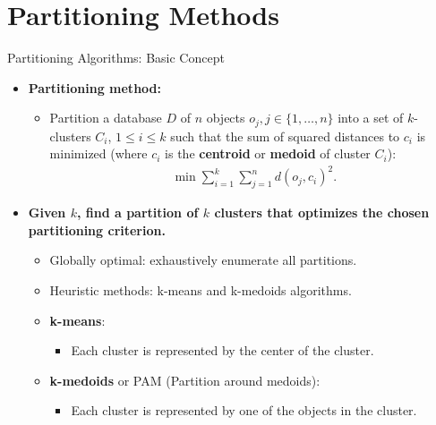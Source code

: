 \section{Partitioning Methods}

\begin{frame}{Partitioning Algorithms: Basic Concept}
	\begin{itemize}
		\item \textbf{Partitioning method:}
		      \begin{itemize}
			      \item Partition a database $D$ of $n$ objects $o_j, j \in \{1,
				            \ldots, n\}$ into a set of $k$-clusters $C_i$, $1 \leq i \leq k$
			            such that the sum of squared distances to $c_i$ is minimized
			            (where $c_i$ is the \textbf{\color{airforceblue}centroid} or
			            \textbf{\color{airforceblue}medoid} of cluster $C_i$):
			            \begin{align*}
				            \min \sum_{i=1}^{k} \sum_{j=1}^{n} d(o_j,c_i)^2.
			            \end{align*}
		      \end{itemize}
		\item \textbf{Given $k$, find a partition of $k$ clusters that
			      optimizes the chosen partitioning criterion.}
		      \begin{itemize}
			      \item Globally optimal: exhaustively enumerate all partitions.
			      \item Heuristic methods: k-means and k-medoids algorithms.
			      \item \textbf{\color{airforceblue}k-means}:
			            \begin{itemize}
				            \item Each cluster is represented by the center of the cluster.
			            \end{itemize}
			      \item \textbf{\color{airforceblue}k-medoids} or PAM (Partition
			            around medoids):
			            \begin{itemize}
				            \item Each cluster is represented by one of the objects in the
				                  cluster.
			            \end{itemize}
		      \end{itemize}
	\end{itemize}
\end{frame}

